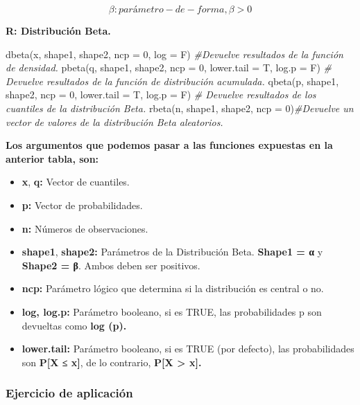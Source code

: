 \documentclass[
]{article}
\newenvironment{Shaded}{\begin{snugshade}}{\end{snugshade}}
\newcommand{\AttributeTok}[1]{\textcolor[rgb]{0.77,0.63,0.00}{#1}}
\newcommand{\CommentTok}[1]{\textcolor[rgb]{0.56,0.35,0.01}{\textit{#1}}}
\newcommand{\DecValTok}[1]{\textcolor[rgb]{0.00,0.00,0.81}{#1}}
\newcommand{\FunctionTok}[1]{\textcolor[rgb]{0.00,0.00,0.00}{#1}}
\newcommand{\NormalTok}[1]{#1}
\begin{document}
\[β:parámetro -de -forma,β>0\]

\textbf{R: Distribución Beta.}

\begin{Shaded}
\begin{Highlighting}[]
\FunctionTok{dbeta}\NormalTok{(x, shape1, shape2, }\AttributeTok{ncp =} \DecValTok{0}\NormalTok{, }\AttributeTok{log =}\NormalTok{ F)  }\CommentTok{\#Devuelve resultados de la función de densidad.}
\FunctionTok{pbeta}\NormalTok{(q, shape1, shape2, }\AttributeTok{ncp =} \DecValTok{0}\NormalTok{, }\AttributeTok{lower.tail =}\NormalTok{ T, }\AttributeTok{log.p =}\NormalTok{ F) }\CommentTok{\#  Devuelve resultados de la función de distribución acumulada.}
\FunctionTok{qbeta}\NormalTok{(p, shape1, shape2, }\AttributeTok{ncp =} \DecValTok{0}\NormalTok{, }\AttributeTok{lower.tail =}\NormalTok{ T, }\AttributeTok{log.p =}\NormalTok{ F) }\CommentTok{\#  Devuelve resultados de los cuantiles de la distribución Beta.}
\FunctionTok{rbeta}\NormalTok{(n, shape1, shape2, }\AttributeTok{ncp =} \DecValTok{0}\NormalTok{)}\CommentTok{\#Devuelve un vector de valores de la distribución Beta aleatorios.}
\end{Highlighting}
\end{Shaded}

\textbf{Los argumentos que podemos pasar a las funciones expuestas en la
anterior tabla, son:}

\begin{itemize}
\item
  \textbf{x}, \textbf{q:} Vector de cuantiles.
\item
  \textbf{p:} Vector de probabilidades.
\item
  \textbf{n:} Números de observaciones.
\item
  \textbf{shape1}, \textbf{shape2:} Parámetros de la Distribución Beta.
  \textbf{Shape1 = α} y \textbf{Shape2 = β}. Ambos deben ser positivos.
\item
  \textbf{ncp:} Parámetro lógico que determina si la distribución es
  central o no.
\item
  \textbf{log, log.p:} Parámetro booleano, si es TRUE, las
  probabilidades p son devueltas como \textbf{log (p).}
\item
  \textbf{lower.tail:} Parámetro booleano, si es TRUE (por defecto), las
  probabilidades son \textbf{P{[}X ≤ x{]}}, de lo contrario,
  \textbf{P{[}X \textgreater{} x{]}.}
\end{itemize}

\hypertarget{ejercicio-de-aplicaciuxf3n}{%
\subsubsection{Ejercicio de
aplicación}\label{ejercicio-de-aplicaciuxf3n}}
\end{document}
